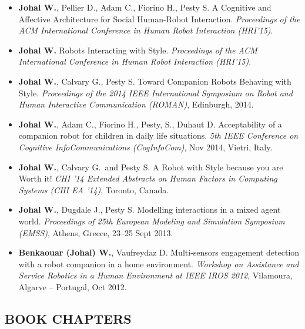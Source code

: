 \begin{itemize}[nosep]
    \item \textbf{Johal W.}, Pellier D., Adam C., Fiorino H., Pesty S. A Cognitive and Affective Architecture for Social Human-Robot Interaction. \textit{Proceedings of the ACM International Conference in Human Robot Interaction (HRI'15)}. \faTrophy

    \item \textbf{Johal W.} Robots Interacting with Style. \textit{Proceedings of the ACM International Conference in Human Robot Interaction (HRI'15)}.

    \item \textbf{Johal W.}, Calvary G., Pesty S. Toward Companion Robots Behaving with Style. \textit{Proceedings of the 2014 IEEE International Symposium on Robot and Human Interactive Communication (ROMAN)}, Edinburgh, 2014.

    \item \textbf{Johal W.}, Adam C., Fiorino H., Pesty, S., Duhaut D. Acceptability of a companion robot for children in daily life situations. \textit{5th IEEE Conference on Cognitive InfoCommunications (CogInfoCom)}, Nov 2014, Vietri, Italy.

    \item \textbf{Johal W.}, Calvary G.\ and Pesty S. A Robot with Style because you are Worth it! \textit{CHI '14 Extended Abstracts on Human Factors in Computing Systems (CHI EA '14)}, Toronto, Canada.

    \item \textbf{Johal W.}, Dugdale J., Pesty S. Modelling interactions in a mixed agent world. \textit{Proceedings of 25th European Modeling and Simulation Symposium (EMSS)}, Athens, Greece, 23--25 Sept 2013.

    \item \textbf{Benkaouar (Johal) W.}, Vaufreydaz D. Multi-sensors engagement detection with a robot companion in a home environment. \textit{Workshop on Assistance and Service Robotics in a Human Environment at IEEE IROS 2012}, Vilamoura, Algarve -- Portugal, Oct 2012.
\end{itemize}

\vspace{0.1in}

\subsection{BOOK CHAPTERS}
\vspace{2pt}

